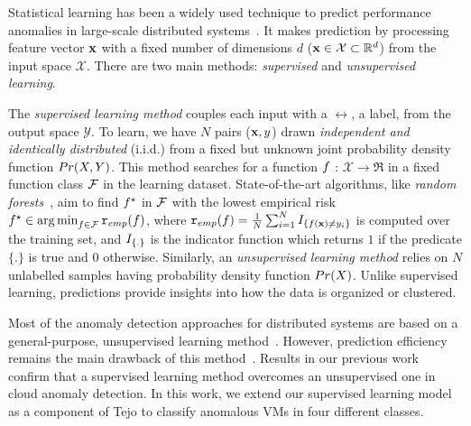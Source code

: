 Statistical learning has been a widely used technique to predict performance anomalies in large-scale distributed systems~\cite{chandola2009anomaly}. It makes prediction by processing feature vector ${\bf x}$ with a fixed
  number of dimensions $d$ (${\bf x} \in {\cal X} \subset \mathbb{R}^d$) from the input space $\mathcal{X}$. There are two main methods: \emph{supervised} and \emph{unsupervised learning}. 

The \emph{supervised learning method} couples each input with a $\rel$, a label, from the output space  $\mathcal{Y}$. To learn, we have $N$ pairs (${\bf x},y$) drawn \emph{independent and identically distributed} (i.i.d.) from a fixed but unknown joint probability density function ${Pr(X,Y)}$. This method searches for a function $f$ : $\mathcal{X} \rightarrow \Re$  in a fixed function class ${\cal F}$ in the learning dataset. State-of-the-art algorithms, like \emph{random forests}~\cite{breiman2001random}, aim to find $f^\star$ in ${\cal F}$ with the lowest empirical risk $f^\star \in \operatorname*{arg\,min}_{f \in {\cal F}} {\tt r}_{emp}(f)$,
where ${\tt r}_{emp}(f) = \frac{1}{N} \sum_{i=1}^N I_{\left \{ f({\bf x}) \neq y_i \right \}}$ is computed over the training set, and $I_{\left \{ . \right \}}$ is the indicator function which returns $1$ if the predicate $\{.\}$ is true and $0$ otherwise. Similarly, an \emph{unsupervised learning method} relies on $N$ unlabelled samples having probability density function ${Pr(X)}$. Unlike supervised learning, predictions provide insights into how the data is organized or clustered.

Most of the anomaly detection approaches for distributed systems are based on a general-purpose, unsupervised learning method~\cite{gujrati2007meta,lan2010toward,guan2013adaptive}. However, prediction efficiency remains the main drawback of this method~\cite{love2002comparing}. Results in our previous work~\cite{silvestre2014anomaly} confirm that a supervised learning method overcomes an unsupervised one in cloud anomaly detection. In this work, we extend our supervised learning model as a component of Tejo to classify anomalous VMs in four different classes.
